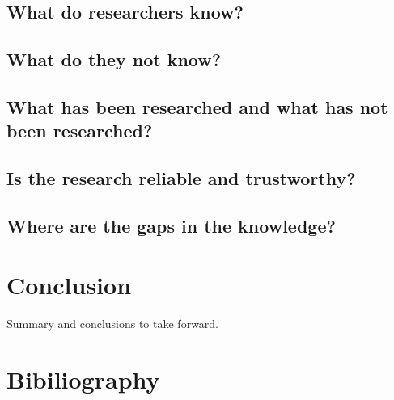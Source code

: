 \documentclass[a4paper, 11pt]{article}
\begin{document}
\subsection{What do researchers know?}


\subsection{What do they not know?}


\subsection{What has been researched and what has not been researched?}


\subsection{Is the research reliable and trustworthy?}


\subsection{Where are the gaps in the knowledge?}

\section{Conclusion}
Summary and conclusions to take forward.

\section{Bibiliography}


\end{document}
